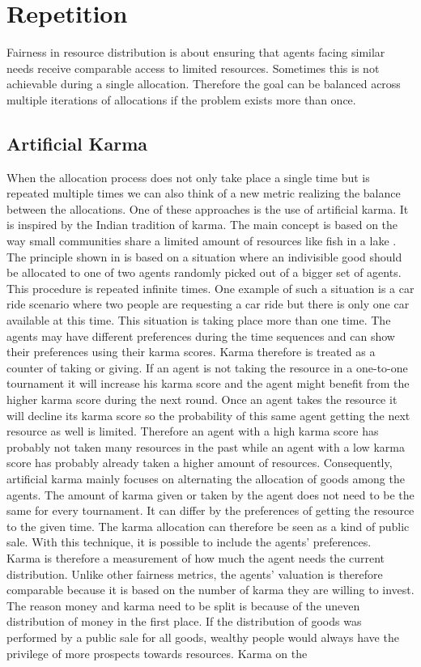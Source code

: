 \documentclass[german, a4paper, 11pt, oneside]{scrbook}
\begin{document}
\section{Repetition}
Fairness in resource distribution is about ensuring that agents facing similar needs receive comparable access to limited resources. Sometimes this is not achievable during a single allocation. Therefore the goal can be balanced across multiple iterations of allocations if the problem exists more than once.\cite{Elokda.2023}
\subsection{Artificial Karma}
When the allocation process does not only take place a single time but is repeated multiple times we can also think of a new metric realizing the balance between the allocations. One of these approaches is the use of artificial karma. It is inspired by the Indian tradition of karma. The main concept is based on the way small communities share a limited amount of resources like fish in a lake \cite{Berkes}. \\The principle shown in \cite{Elokda.2023} is based on a situation where an indivisible good should be allocated to one of two agents randomly picked out of a bigger set of agents. This procedure is repeated infinite times. One example of such a situation is a car ride scenario where two people are requesting a car ride but there is only one car available at this time. This situation is taking place more than one time. The agents may have different preferences during the time sequences and can show their preferences using their karma scores. Karma therefore is treated as a counter of taking or giving. If an agent is not taking the resource in a one-to-one tournament it will increase his karma score and the agent might benefit from the higher karma score during the next round. Once an agent takes the resource it will decline its karma score so the probability of this same agent getting the next resource as well is limited. Therefore an agent with a high karma score has probably not taken many resources in the past while an agent with a low karma score has probably already taken a higher amount of resources. Consequently, artificial karma mainly focuses on alternating the allocation of goods among the agents.  The amount of karma given or taken by the agent does not need to be the same for every tournament. It can differ by the preferences of getting the resource to the given time. The karma allocation can therefore be seen as a kind of public sale. With this technique, it is possible to include the agents' preferences.  \cite{Elokda.2023} \\Karma is therefore a measurement of how much the agent needs the current distribution. Unlike other fairness metrics, the agents' valuation is therefore comparable because it is based on the number of karma they are willing to invest. \\The reason money and karma need to be split is because of the uneven distribution of money in the first place. If the distribution of goods was performed by a public sale for all goods, wealthy people would always have the privilege of more prospects towards resources. Karma on the 
\end{document}
